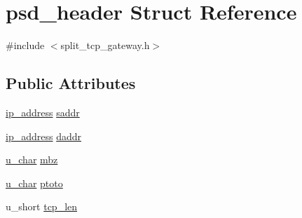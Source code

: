 \hypertarget{structpsd__header}{\section{psd\-\_\-header \-Struct \-Reference}
\label{structpsd__header}
}


{\ttfamily \#include $<$split\-\_\-tcp\-\_\-gateway.\-h$>$}

\subsection*{\-Public \-Attributes}
\begin{DoxyCompactItemize}
\item 
\hyperlink{structip__address}{ip\-\_\-address} \hyperlink{structpsd__header_af934fedec53c4ea727c2f5f341f50595}{saddr}
\item 
\hyperlink{structip__address}{ip\-\_\-address} \hyperlink{structpsd__header_ac41be6ffba22a86307644444a818f419}{daddr}
\item 
\hyperlink{split__tcp__gateway_8h_ae2b02ed168fc99cff3851603910b1fb6}{u\-\_\-char} \hyperlink{structpsd__header_a8790d2f82a9b2031d8144f2627c4f4c9}{mbz}
\item 
\hyperlink{split__tcp__gateway_8h_ae2b02ed168fc99cff3851603910b1fb6}{u\-\_\-char} \hyperlink{structpsd__header_ac3af2de6f30534e1cf4b3d8985c12a83}{ptoto}
\item 
u\-\_\-short \hyperlink{structpsd__header_a13e8c4030f69d21c7f78ab54e75ef43c}{tcp\-\_\-len}
\end{DoxyCompactItemize}


